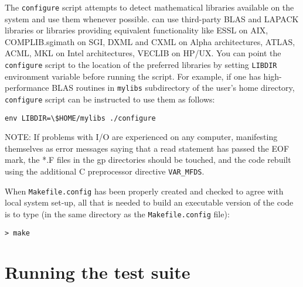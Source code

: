 The \verb|configure| script attempts to detect mathematical libraries
available on the system and use them whenever possible. {\dalton} can
use third-party BLAS and LAPACK libraries or libraries providing
equivalent functionality like ESSL on AIX, COMPLIB.sgimath on SGI,
DXML and CXML on Alpha architectures, ATLAS, ACML, MKL on Intel
architectures, VECLIB on HP/UX. You can point the \verb|configure|
script to the location of the preferred libraries by setting
\verb|LIBDIR| environment variable before running the script. For
example, if one has high-performance BLAS routines in \verb|mylibs|
subdirectory of the user's home directory, \verb|configure| script can
be instructed to use them as follows:
\begin{verbatim}
env LIBDIR=\$HOME/mylibs ./configure
\end{verbatim}


NOTE: If problems with I/O are experienced on
any computer,
manifesting themselves as error messages saying that a read statement
has passed the EOF mark, the *.F files in the gp directories should be
touched, and the code rebuilt using the additional C preprocessor
directive \verb|VAR_MFDS|.

When  \verb|Makefile.config| has been properly
created and checked
to agree with local system set-up, all that is needed
to build an executable version of the
code is to type
(in the same directory as the \verb|Makefile.config| file):
\begin{verbatim}
> make
\end{verbatim}
%

\section{Running the {\dalton} test suite}\label{sec:testsuite}

